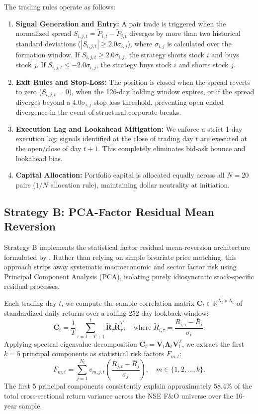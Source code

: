 \documentclass[11pt,a4paper]{article}
\begin{document}
The trading rules operate as follows:
\begin{enumerate}
    \item \textbf{Signal Generation and Entry:} A pair trade is triggered when the normalized spread $S_{i,j,t} = \tilde{P}_{i,t} - \tilde{P}_{j,t}$ diverges by more than two historical standard deviations ($|S_{i,j,t}| \ge 2.0\sigma_{i,j}$), where $\sigma_{i,j}$ is calculated over the formation window. If $S_{i,j,t} \ge 2.0\sigma_{i,j}$, the strategy shorts stock $i$ and buys stock $j$. If $S_{i,j,t} \le -2.0\sigma_{i,j}$, the strategy buys stock $i$ and shorts stock $j$.
    \item \textbf{Exit Rules and Stop-Loss:} The position is closed when the spread reverts to zero ($S_{i,j,t} = 0$), when the 126-day holding window expires, or if the spread diverges beyond a $4.0\sigma_{i,j}$ stop-loss threshold, preventing open-ended divergence in the event of structural corporate breaks.
    \item \textbf{Execution Lag and Lookahead Mitigation:} We enforce a strict 1-day execution lag: signals identified at the close of trading day $t$ are executed at the open/close of day $t+1$. This completely eliminates bid-ask bounce and lookahead bias.
    \item \textbf{Capital Allocation:} Portfolio capital is allocated equally across all $N=20$ pairs ($1/N$ allocation rule), maintaining dollar neutrality at initiation.
\end{enumerate}

\subsection{Strategy B: PCA-Factor Residual Mean Reversion}
Strategy B implements the statistical factor residual mean-reversion architecture formulated by \citet{avellaneda2010statistical}. Rather than relying on simple bivariate price matching, this approach strips away systematic macroeconomic and sector factor risk using Principal Component Analysis (PCA), isolating purely idiosyncratic stock-specific residual processes.

Each trading day $t$, we compute the sample correlation matrix $\mathbf{C}_t \in \mathbb{R}^{N_t \times N_t}$ of standardized daily returns over a rolling 252-day lookback window:
\begin{equation}
    \mathbf{C}_t = \frac{1}{T} \sum_{\tau=t-T+1}^t \tilde{\mathbf{R}}_\tau \tilde{\mathbf{R}}_\tau^T, \quad \text{where } \tilde{R}_{i,\tau} = \frac{R_{i,\tau} - \bar{R}_i}{\sigma_i}.
    \label{eq:corr_matrix}
\end{equation}
Applying spectral eigenvalue decomposition $\mathbf{C}_t = \mathbf{V}_t \mathbf{\Lambda}_t \mathbf{V}_t^T$, we extract the first $k=5$ principal components as statistical risk factors $F_{m,t}$:
\begin{equation}
    F_{m,t} = \sum_{j=1}^{N_t} v_{m,j,t} \left(\frac{R_{j,t} - \bar{R}_j}{\sigma_j}\right), \quad m \in \{1, 2, \ldots, k\}.
    \label{eq:pca_factors}
\end{equation}
The first 5 principal components consistently explain approximately $58.4\%$ of the total cross-sectional return variance across the NSE F\&O universe over the 16-year sample.
\end{document}
